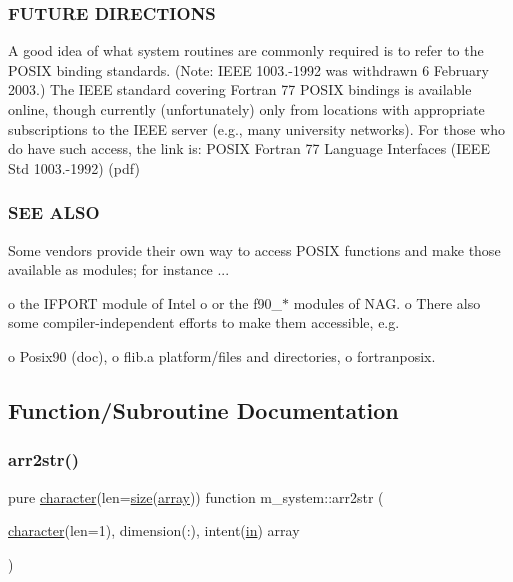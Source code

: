 \subsubsection*{F\+U\+T\+U\+RE D\+I\+R\+E\+C\+T\+I\+O\+NS}

A good idea of what system routines are commonly required is to refer to the P\+O\+S\+IX binding standards. (Note\+: I\+E\+EE 1003.-\/1992 was withdrawn 6 February 2003.) The I\+E\+EE standard covering Fortran 77 P\+O\+S\+IX bindings is available online, though currently (unfortunately) only from locations with appropriate subscriptions to the I\+E\+EE server (e.\+g., many university networks). For those who do have such access, the link is\+: P\+O\+S\+IX Fortran 77 Language Interfaces (I\+E\+EE Std 1003.-\/1992) (pdf)

\subsubsection*{S\+EE A\+L\+SO}

Some vendors provide their own way to access P\+O\+S\+IX functions and make those available as modules; for instance ...

o the I\+F\+P\+O\+RT module of Intel o or the f90\+\_\+$\ast$ modules of N\+AG. o There also some compiler-\/independent efforts to make them accessible, e.\+g.

o Posix90 (doc), o flib.\+a platform/files and directories, o fortranposix. 

\subsection{Function/\+Subroutine Documentation}
\mbox{\label{namespacem__system_aeb3d7d4cb39d59917910a3ae2532206d}} 
\subsubsection{\texorpdfstring{arr2str()}{arr2str()}}
{\footnotesize\ttfamily pure \hyperlink{option__stopwatch_83_8txt_abd4b21fbbd175834027b5224bfe97e66}{character}(len=\hyperlink{what__overview_81_8txt_ab5692ed87074f1d5ec850a9ffa8b5af9}{size}(\hyperlink{intro__blas1_83_8txt_a89db1945e1a335ab0184c6a097821e32}{array})) function m\+\_\+system\+::arr2str (\begin{DoxyParamCaption}\item[{\hyperlink{option__stopwatch_83_8txt_abd4b21fbbd175834027b5224bfe97e66}{character}(len=1), dimension(\+:), intent(\hyperlink{M__journal_83_8txt_afce72651d1eed785a2132bee863b2f38}{in})}]{array }\end{DoxyParamCaption})\hspace{0.3cm}{\ttfamily [private]}}

